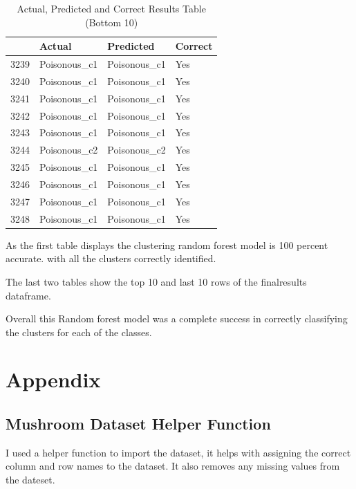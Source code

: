 \documentclass[10pt  ,usenames, dvipsnames]{article}\usepackage[]{graphicx}\usepackage[]{color}
\begin{document}
\begin{table}[ht]
\centering
\caption{Actual, Predicted and Correct Results Table (Bottom 10)}
\begin{tabular}{rlll}
  \hline
 & Actual & Predicted & Correct \\ 
  \hline
3239 & Poisonous\_c1 & Poisonous\_c1 & Yes \\ 
  3240 & Poisonous\_c1 & Poisonous\_c1 & Yes \\ 
  3241 & Poisonous\_c1 & Poisonous\_c1 & Yes \\ 
  3242 & Poisonous\_c1 & Poisonous\_c1 & Yes \\ 
  3243 & Poisonous\_c1 & Poisonous\_c1 & Yes \\ 
  3244 & Poisonous\_c2 & Poisonous\_c2 & Yes \\ 
  3245 & Poisonous\_c1 & Poisonous\_c1 & Yes \\ 
  3246 & Poisonous\_c1 & Poisonous\_c1 & Yes \\ 
  3247 & Poisonous\_c1 & Poisonous\_c1 & Yes \\ 
  3248 & Poisonous\_c1 & Poisonous\_c1 & Yes \\ 
   \hline
\end{tabular}
\label{tab3}
\end{table}

As the first table displays the clustering random forest model is 100 percent accurate. with all the clusters correctly identified.

The last two tables show the top 10 and last 10 rows of the finalresults dataframe.

Overall this Random forest model was a complete success in correctly classifying the clusters for each of the classes.



\clearpage

\section{Appendix}

\subsection{Mushroom Dataset Helper Function}

I used a helper function to import the dataset, it helps with assigning the correct column and row names to the dataset. It also removes any missing values from the dateset.
\end{document}
